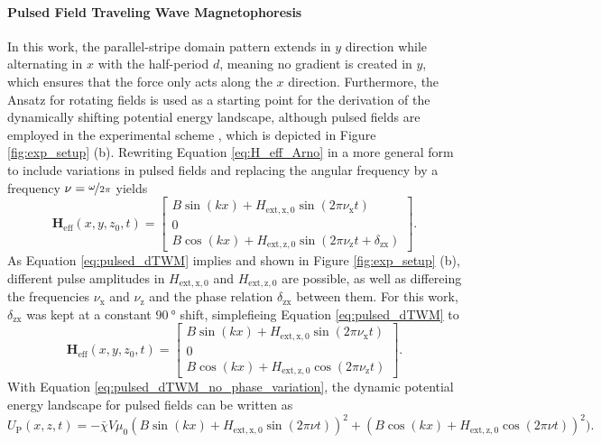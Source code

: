\paragraph{Pulsed Field Traveling Wave Magnetophoresis}\label{para:PFTWM} 

In this work, the parallel-stripe domain pattern extends in $y$ direction while alternating in $x$ with the half-period $d$, meaning no gradient is created in $y$, which ensures that the force only acts along the $x$ direction\cite{Holzinger2015a}. 
Furthermore, the Ansatz for rotating fields is used as a starting point for the derivation of the dynamically shifting potential energy landscape, although pulsed fields are employed in the experimental scheme \cite{Holzinger2015a, Shubbak2026}, which is depicted in Figure \ref{fig:exp_setup} (b).
Rewriting Equation \ref{eq:H_eff_Arno} in a more general form to include variations in pulsed fields\cite{Ehresmann2026} and replacing the angular frequency by a frequency $\nu = \nicefrac{\omega}{2\pi}$\cite{Shubbak2026} yields
\begin{equation}\label{eq:pulsed_dTWM}
    \mathbf{H}_\mathrm{eff}(x,y,z_0,t) = \begin{bmatrix}
        B \sin(kx) + H_\mathrm{ext,x,0}\sin(2\pi\nu_\mathrm{x} t) \\
        0 \\
        B \cos(kx) + H_\mathrm{ext,z,0}\sin(2\pi\nu_\mathrm{z} t + \delta_\mathrm{zx})
    \end{bmatrix}.
\end{equation}
As Equation \ref{eq:pulsed_dTWM} implies and shown in Figure \ref{fig:exp_setup} (b), different pulse amplitudes in $H_\mathrm{ext,x,0}$ and $H_\mathrm{ext,z,0}$ are possible, as well as differeing the frequencies $\nu_\mathrm{x}$ and $\nu_\mathrm{z}$ and the phase relation $\delta_\mathrm{zx}$ between them. 
For this work, $\delta_\mathrm{zx}$ was kept at a constant $\SI{90}{\degree}$ shift, simplefieing Equation \ref{eq:pulsed_dTWM} to 
\begin{equation}\label{eq:pulsed_dTWM_no_phase_variation}
    \mathbf{H}_\mathrm{eff}(x,y,z_0,t) = \begin{bmatrix}
        B \sin(kx) + H_\mathrm{ext,x,0}\sin(2\pi\nu_\mathrm{x} t) \\
        0 \\
        B \cos(kx) + H_\mathrm{ext,z,0}\cos(2\pi\nu_\mathrm{z} t )
    \end{bmatrix}.
\end{equation}
With Equation \ref{eq:pulsed_dTWM_no_phase_variation}, the dynamic potential energy landscape for pulsed fields can be written as\cite{Ehresmann2026}
\begin{equation}
    U_\mathrm{P}(x,z,t) = -\bar{\chi}V\mu_0 (B\sin(kx) + H_\mathrm{ext,x,0}\sin(2\pi\nu t))^2 + (B\cos(kx) + H_\mathrm{ext,z,0}\cos(2\pi\nu t))^2).
\end{equation}



